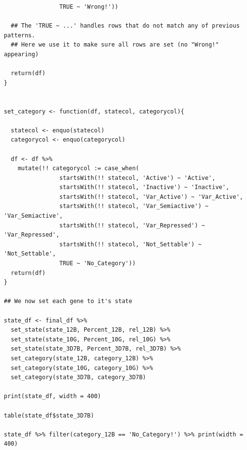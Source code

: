 \documentclass[11pt]{article}
\begin{document}
\begin{verbatim}
                TRUE ~ 'Wrong!'))

  ## The 'TRUE ~ ...' handles rows that do not match any of previous patterns.
  ## Here we use it to make sure all rows are set (no "Wrong!" appearing)

  return(df)
}


set_category <- function(df, statecol, categorycol){

  statecol <- enquo(statecol)
  categorycol <- enquo(categorycol)

  df <- df %>%
    mutate(!! categorycol := case_when(
                startsWith(!! statecol, 'Active') ~ 'Active',
                startsWith(!! statecol, 'Inactive') ~ 'Inactive',
                startsWith(!! statecol, 'Var_Active') ~ 'Var_Active',
                startsWith(!! statecol, 'Var_Semiactive') ~ 'Var_Semiactive',
                startsWith(!! statecol, 'Var_Repressed') ~ 'Var_Repressed',
                startsWith(!! statecol, 'Not_Settable') ~ 'Not_Settable',
                TRUE ~ 'No_Category'))
  return(df)
}

## We now set each gene to it's state

state_df <- final_df %>%
  set_state(state_12B, Percent_12B, rel_12B) %>%
  set_state(state_10G, Percent_10G, rel_10G) %>%
  set_state(state_3D7B, Percent_3D7B, rel_3D7B) %>%
  set_category(state_12B, category_12B) %>%
  set_category(state_10G, category_10G) %>%
  set_category(state_3D7B, category_3D7B)

print(state_df, width = 400)

table(state_df$state_3D7B)

state_df %>% filter(category_12B == 'No_Category!') %>% print(width = 400)
\end{verbatim}
\end{document}
